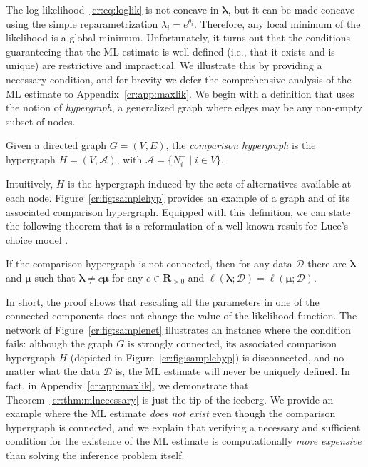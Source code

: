 The log-likelihood~\eqref{cr:eq:loglik} is not concave in $\bm{\lambda}$, but it can be made concave using the simple reparametrization $\lambda_i = e^{\theta_i}$.
Therefore, any local minimum of the likelihood is a global minimum.
Unfortunately, it turns out that the conditions guaranteeing that the ML estimate is well-defined (i.e., that it exists and is unique) are restrictive and impractical.
We illustrate this by providing a necessary condition, and for brevity we defer the comprehensive analysis of the ML estimate to Appendix~\ref{cr:app:maxlik}.
We begin with a definition that uses the notion of \emph{hypergraph}, a generalized graph where edges may be any non-empty subset of nodes.
\begin{definition}
Given a directed graph $G = (V, E)$, the \emph{comparison hypergraph} is the hypergraph $H = (V, \mathcal{A})$, with $\mathcal{A} = \{ N^+_i \mid i \in V \}$.
\end{definition}
Intuitively, $H$ is the hypergraph induced by the sets of alternatives available at each node.
Figure~\ref{cr:fig:samplehyp} provides an example of a graph and of its associated comparison hypergraph.
Equipped with this definition, we can state the following theorem that is a reformulation of a well-known result for Luce's choice model \citep{hunter2004mm}.
\begin{theorem}
\label{cr:thm:mlnecessary}
If the comparison hypergraph is not connected, then for any data $\mathcal{D}$ there are $\bm{\lambda}$ and $\bm{\mu}$ such that $\bm{\lambda} \neq c \bm{\mu}$ for any $c \in \mathbf{R}_{>0}$ and $\ell(\bm{\lambda} ; \mathcal{D}) = \ell(\bm{\mu} ; \mathcal{D}).$
\end{theorem}
In short, the proof shows that rescaling all the parameters in one of the connected components does not change the value of the likelihood function.
The network of Figure~\ref{cr:fig:samplenet} illustrates an instance where the condition fails:
although the graph $G$ is strongly connected, its associated comparison hypergraph $H$ (depicted in Figure~\ref{cr:fig:samplehyp}) is disconnected, and no matter what the data $\mathcal{D}$ is, the ML estimate will never be uniquely defined.
In fact, in Appendix~\ref{cr:app:maxlik}, we demonstrate that Theorem~\ref{cr:thm:mlnecessary} is just the tip of the iceberg.
We provide an example where the ML estimate \emph{does not exist} even though the comparison hypergraph is connected, and we explain that verifying a necessary and sufficient condition for the existence of the ML estimate is computationally \emph{more expensive} than solving the inference problem itself.

